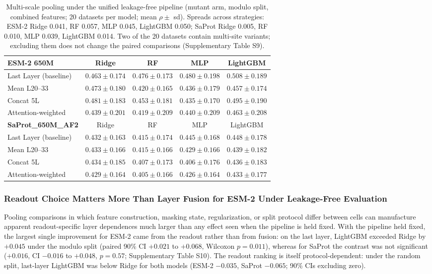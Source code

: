 \documentclass[numbered,webpdf,modern,large]{oup-authoring-template}
\newcommand{\rone}[1]{#1}
\newcommand{\rtwo}[1]{#1}
\newcommand{\rthree}[1]{#1}
\begin{document}
\begin{table}[!tbp]
\centering
\caption{\rone{Multi-scale pooling under the unified leakage-free pipeline (mutant
arm, modulo split, combined features; 20 datasets per model; mean $\rho \pm$ sd).
Spreads across strategies: ESM-2 Ridge 0.041, RF 0.057, MLP 0.045, LightGBM 0.050;
SaProt Ridge 0.005, RF 0.010, MLP 0.039, LightGBM 0.014. \rthree{Two of the 20 datasets
contain multi-site variants; excluding them does not change the paired comparisons
(Supplementary Table S9).}}}
\label{tab:pooling}
\begin{tabular}{lcccc}
\toprule
\textbf{ESM-2 650M} & Ridge & RF & MLP & LightGBM \\
\midrule
Last Layer (baseline) & $0.463 \pm 0.174$ & $0.476 \pm 0.173$ & $0.480 \pm 0.198$ & $\mathbf{0.508} \pm 0.189$ \\
Mean L20--33          & $0.473 \pm 0.180$ & $0.420 \pm 0.165$ & $0.436 \pm 0.179$ & $0.457 \pm 0.174$ \\
Concat 5L             & $0.481 \pm 0.183$ & $0.453 \pm 0.181$ & $0.435 \pm 0.170$ & $0.495 \pm 0.190$ \\
Attention-weighted    & $0.439 \pm 0.201$ & $0.419 \pm 0.209$ & $0.440 \pm 0.209$ & $0.463 \pm 0.208$ \\
\midrule
\textbf{SaProt\_650M\_AF2} & Ridge & RF & MLP & LightGBM \\
\midrule
Last Layer (baseline) & $0.432 \pm 0.163$ & $0.415 \pm 0.174$ & $0.445 \pm 0.168$ & $\mathbf{0.448} \pm 0.178$ \\
Mean L20--33          & $0.433 \pm 0.166$ & $0.415 \pm 0.166$ & $0.429 \pm 0.166$ & $0.439 \pm 0.182$ \\
Concat 5L             & $0.434 \pm 0.185$ & $0.407 \pm 0.173$ & $0.406 \pm 0.176$ & $0.436 \pm 0.183$ \\
Attention-weighted    & $0.429 \pm 0.164$ & $0.405 \pm 0.166$ & $0.426 \pm 0.164$ & $0.433 \pm 0.177$ \\
\bottomrule
\end{tabular}
\end{table}

\subsubsection{\rtwo{Readout Choice Matters More Than Layer Fusion for ESM-2} \rthree{Under Leakage-Free Evaluation}}

\rtwo{Pooling comparisons in which feature construction, masking state,
regularization, or split protocol differ between cells can manufacture apparent
readout-specific layer dependences much larger than any effect seen when the pipeline
is held fixed. With the pipeline held fixed, the largest single improvement for ESM-2
came from the readout rather than from fusion: on the last layer, LightGBM exceeded
Ridge by $+0.045$ under the modulo split (paired 90\% CI $+0.021$ to $+0.068$,
Wilcoxon $p = 0.011$), whereas for SaProt the contrast was not significant
($+0.016$, CI $-0.016$ to $+0.048$, $p = 0.57$; Supplementary Table \rthree{S10}).}
\rthree{The readout ranking is itself protocol-dependent: under the random split,
last-layer LightGBM was below Ridge for both models (ESM-2 $-0.035$, SaProt $-0.065$;
90\% CIs excluding zero).}
\end{document}
